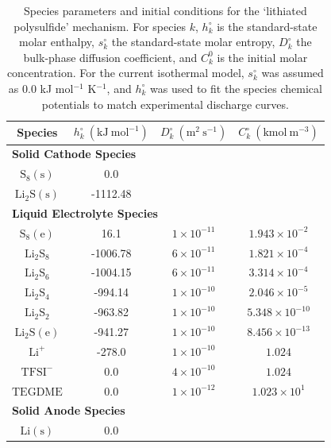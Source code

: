 \documentclass{elsarticle}
\begin{document}
\begin{table}[h!]
\begin{center}
 \begin{tabular}{cccc}
 \hline\hline
 Species & ${h}^\circ_k ~ \left(\mathrm{kJ} ~ \mathrm{mol}^{-1}\right)$  & ${D}^\circ_k ~ \left(\mathrm{m}^2 ~ \mathrm{s}^{-1}\right)$ & ${C}^\circ_{k} ~ \left(\mathrm{kmol} ~ \mathrm{m}^{-3}\right)$ \\
 \hline
 \multicolumn{4}{l}{\bf Solid Cathode Species}\\
 $\mathrm{S}_8(\mathrm{s})$ & 0.0  &  &  \\
 $\mathrm{Li}_2\mathrm{S}(\mathrm{s})$ & -1112.48 &  &  \\
 \multicolumn{4}{l}{\bf Liquid Electrolyte Species}\\
 $\mathrm{S}_8(\mathrm{e})$ & 16.1 & $1 \times 10^{-11}$ & $1.943 \times 10^{-2}$ \\
 $\mathrm{Li}_2\mathrm{S}_8$ & -1006.78  & $6 \times 10^{-11}$ & $1.821 \times 10^{-4}$ \\
 $\mathrm{Li}_2\mathrm{S}_6$ & -1004.15  & $6 \times 10^{-11}$ & $3.314 \times 10^{-4}$ \\
 $\mathrm{Li}_2\mathrm{S}_4$ & -994.14  & $1 \times 10^{-10}$ & $2.046 \times 10^{-5}$ \\
 $\mathrm{Li}_2\mathrm{S}_2$ & -963.82 & $1 \times 10^{-10}$ & $5.348 \times 10^{-10}$ \\
 $\mathrm{Li}_2\mathrm{S}(\mathrm{e})$ & -941.27  & $1 \times 10^{-10}$ & $8.456 \times 10^{-13}$ \\
 $\mathrm{Li}^+$ & -278.0 & $1 \times 10^{-10}$ & $1.024$ \\
 $\mathrm{TFSI}^-$ & 0.0  & $4 \times 10^{-10}$ & $1.024$ \\
 $\mathrm{TEGDME}$ & 0.0 & $1 \times 10^{-12}$ & $1.023 \times 10^{1}$ \\
 \multicolumn{4}{l}{\bf Solid Anode Species}\\
 $\mathrm{Li}(\mathrm{s})$ & 0.0 & &  \\
 \hline\hline
\end{tabular}
\caption{Species parameters and initial conditions for the `lithiated polysulfide' mechanism. For species $k$, $h^\circ_k$ is the standard-state molar enthalpy, $s^\circ_k$ the standard-state molar entropy, $D^\circ_k$ the bulk-phase diffusion coefficient, and $C^0_k$ is the initial molar concentration. For the current isothermal model, $s^\circ_k$ was assumed as 0.0 kJ mol$^{-1}$ K$^{-1}$, and $h^\circ_k$ was used to fit the species chemical potentials to match experimental discharge curves.}
\label{tab:lithiated_thermo}
\end{center}
\end{table}
\end{document}
